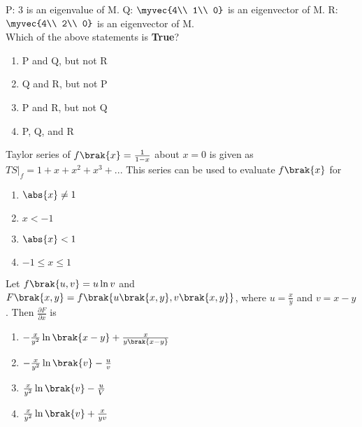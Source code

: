 P: 3 is an eigenvalue of M.   Q: $\myvec{4\\
1\\
0}$ is an eigenvector of M.   R: $\myvec{4\\
2\\
0}$ is an eigenvector of M. \\
Which of the above statements is \textbf{True}?
\begin{enumerate}
	\item P and Q, but not R
	\item Q and R, but not P
	\item P and R, but not Q
	\item P, Q, and R
\end{enumerate}
\item Taylor series of $f\brak{x} = \frac{1}{1 - x}$ about $x = 0$ is given as $TS|_f = 1 + x + x^2 + x^3 + ...$ This series can be used to evaluate $f\brak{x}$ for
	\begin{enumerate}
		\item $\abs{x} \neq 1$
		\item $x < -1$
		\item $\abs{x} < 1$
		\item $-1 \leq x \leq 1$
	\end{enumerate}
\item Let $f\brak{u, v} = u\ln{v}$ and $F\brak{x, y} = f\brak{u\brak{x, y}, v\brak{x, y}}$, where $u = \frac{x}{y}$ and $v = x - y$. Then $\frac{\partial F}{\partial x}$ is
	\begin{enumerate}
		\item $-\frac{x}{y^2}\ln{\brak{x - y}} + \frac{x}{y\brak{x - y}}$
		\item $-\frac{x}{y^2}\ln{\brak{v}} - \frac{u}{v}$
		\item $\frac{x}{y^2}\ln{\brak{v}} - \frac{u}{V}$
		\item $\frac{x}{y^2}\ln{\brak{v}} + \frac{x}{yv}$
	\end{enumerate}

